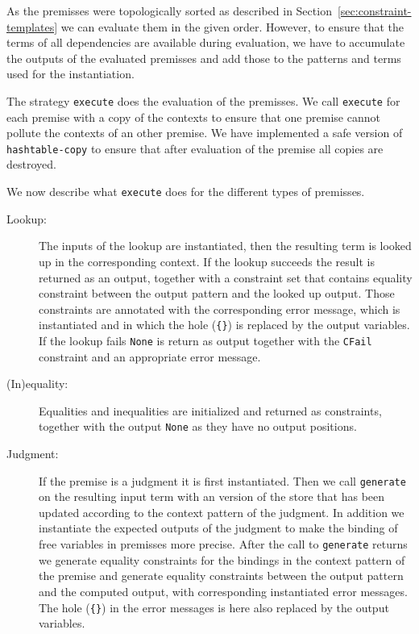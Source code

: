 As the premisses were topologically sorted as described in
Section~\ref{sec:constraint-templates} we can evaluate them in the
given order. However, to ensure that the terms of all dependencies are
available during evaluation, we have to accumulate the outputs of the
evaluated premisses and add those to the patterns and terms used for
the instantiation.

The strategy \verb|execute| does the evaluation of the premisses. We
call \verb|execute| for each premise with a copy of the contexts to
ensure that one premise cannot pollute the contexts of an other
premise. We have implemented a safe version of \verb|hashtable-copy|
to ensure that after evaluation of the premise all copies are
destroyed.

We now describe what \verb|execute| does for the different types of
premisses.

\begin{description}
\item[Lookup:] The inputs of the lookup are instantiated, then the
  resulting term is looked up in the corresponding context. If the
  lookup succeeds the result is returned as an output, together with a
  constraint set that contains equality constraint between the output
  pattern and the looked up output. Those constraints are annotated
  with the corresponding error message, which is instantiated and in
  which the hole (\verb|{}|) is replaced by the output variables. If
  the lookup fails \verb|None| is return as output together with the
  \verb|CFail| constraint and an appropriate error message.
\item[(In)equality:] Equalities and inequalities are initialized and
  returned as constraints, together with the output \verb|None| as
  they have no output positions.
\item[Judgment:] If the premise is a judgment it is first
  instantiated. Then we call \verb|generate| on the resulting input
  term with an version of the store that has been updated according to
  the context pattern of the judgment. In addition we instantiate the
  expected outputs of the judgment to make the binding of free
  variables in premisses more precise. After the call to
  \verb|generate| returns we generate equality constraints for the
  bindings in the context pattern of the premise and generate equality
  constraints between the output pattern and the computed output, with
  corresponding instantiated error messages. The hole (\verb|{}|) in
  the error messages is here also replaced by the output variables.
\end{description}

